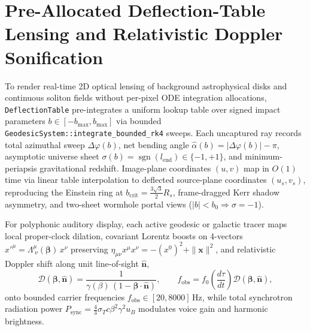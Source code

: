 \documentclass[12pt]{article}
\begin{document}
\section{Pre-Allocated Deflection-Table Lensing and Relativistic Doppler Sonification}

To render real-time 2D optical lensing of background astrophysical disks and continuous soliton fields without per-pixel ODE integration allocations, \texttt{DeflectionTable} pre-integrates a uniform lookup table over signed impact parameters $b \in [-b_{\max}, b_{\max}]$ via bounded \texttt{GeodesicSystem::integrate\_bounded\_rk4} sweeps. Each uncaptured ray records total azimuthal sweep $\Delta\varphi(b)$, net bending angle $\hat{\alpha}(b) = |\Delta\varphi(b)| - \pi$, asymptotic universe sheet $\sigma(b) = \operatorname{sgn}(l_{\text{end}}) \in \{-1, +1\}$, and minimum-periapsis gravitational redshift. Image-plane coordinates $(u, v)$ map in $O(1)$ time via linear table interpolation to deflected source-plane coordinates $(u_s, v_s)$, reproducing the Einstein ring at $b_{\text{crit}} = \frac{3\sqrt{3}}{2} R_s$, frame-dragged Kerr shadow asymmetry, and two-sheet wormhole portal views ($|b| < b_0 \Rightarrow \sigma = -1$).

For polyphonic auditory display, each active geodesic or galactic tracer maps local proper-clock dilation, covariant Lorentz boosts on 4-vectors $x'^\mu = \Lambda^\mu_{\;\nu}(\boldsymbol{\beta})\,x^\nu$ preserving $\eta_{\mu\nu} x^\mu x^\nu = -(x^0)^2 + \|\mathbf{x}\|^2$, and relativistic Doppler shift along unit line-of-sight $\hat{\mathbf{n}}$,
\begin{equation}
\mathcal{D}(\boldsymbol{\beta}, \hat{\mathbf{n}})
= \frac{1}{\gamma(\beta)\,\left(1 - \boldsymbol{\beta}\cdot\hat{\mathbf{n}}\right)},
\qquad
f_{\text{obs}} = f_0 \left(\frac{d\tau}{dt}\right) \mathcal{D}(\boldsymbol{\beta}, \hat{\mathbf{n}}),
\end{equation}
onto bounded carrier frequencies $f_{\text{obs}} \in [20, 8000]\,\text{Hz}$, while total synchrotron radiation power $P_{\text{sync}} = \frac{4}{3}\sigma_T c \beta^2 \gamma^2 u_B$ modulates voice gain and harmonic brightness.



\end{document}
